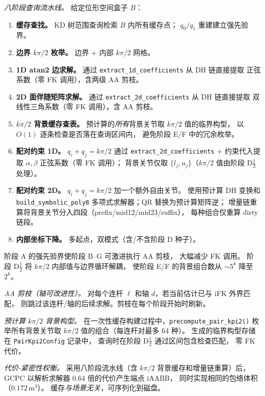 \documentclass[journal]{IEEEtran}
\begin{document}
\emph{八阶段查询流水线。}
给定位形空间盒子 $B$：
\begin{enumerate}
  \item[\textbf{A.}] \textbf{缓存查找。}
    KD 树范围查询检索 $B$ 内所有缓存点；
    $q_0/q_1$ 重建建立强先验界。
  \item[\textbf{B.}] \textbf{边界 $k\pi/2$ 枚举。}
    边界 + 内部 $k\pi/2$ 网格。
  \item[\textbf{C.}] \textbf{1D atan2 边求解。}
    通过 \texttt{extract\_1d\_coefficients} 从 DH 链直接提取
    正弦系数（零 FK 调用），含两级 AA 剪枝。
  \item[\textbf{D.}] \textbf{2D 面伴随矩阵求解。}
    通过 \texttt{extract\_2d\_coefficients} 从 DH 链直接提取
    双线性三角系数（零 FK 调用），含 AA 剪枝。
  \item[\textbf{D$\tfrac{1}{2}$.}] \textbf{$k\pi/2$ 背景缓存查表。}
    预计算的\emph{所有}背景关节取 $k\pi/2$ 值的临界构型，
    以 $O(1)$ 逐条检查是否落在查询区间内，
    避免阶段 E/F 中的冗余枚举。
  \item[\textbf{E.}] \textbf{配对约束 1D。}
    $q_i + q_j = k\pi/2$ 通过 \texttt{extract\_2d\_coefficients}
    + 约束代入提取 $\alpha,\beta$ 正弦系数（零 FK 调用）；
    背景关节仅取 $\{l_j, u_j\}$（$k\pi/2$ 值由阶段 D$\tfrac{1}{2}$ 处理）。
  \item[\textbf{F.}] \textbf{配对约束 2D。}
    $q_i + q_j = k\pi/2$ 加一个额外自由关节。
    使用预计算 DH 变换和 \texttt{build\_symbolic\_poly8}
    多项式求解器；QR 替换为预计算矩阵逆；
    增量链重算将背景关节分入四段（prefix/mid12/mid23/suffix），
    每种组合仅重算 dirty 链段。
  \item[\textbf{G.}] \textbf{内部坐标下降。}
    多起点，双模式（含/不含阶段 D 种子）。
\end{enumerate}
阶段 A 的强先验界使阶段 B--G 可激进执行 AA 剪枝，
大幅减少 FK 调用。
阶段 D$\tfrac{1}{2}$ 将 $k\pi/2$ 内部值与边界循环解耦，
使阶段 E/F 的背景组合数从 $\sim\!5^k$ 降至 $2^k$。

\emph{AA 剪枝（轴可改进性）。}
对每个连杆 $\ell$ 和轴 $d$，若当前估计已与 iFK 外界匹配，
则跳过该连杆/轴的后续求解。剪枝在每个阶段开始时刷新。

\emph{预计算 $k\pi/2$ 背景构型。}
在一次性缓存构建过程中，\texttt{precompute\_pair\_kpi2()}
枚举所有背景关节取 $k\pi/2$ 值的组合（每连杆对最多 64 种）。
生成的临界构型存储在 \texttt{PairKpi2Config} 记录中，
查询时在阶段 D$\tfrac{1}{2}$ 通过区间包含检查匹配，
零 FK 代价。

\emph{代价-紧密性权衡。}
采用八阶段流水线（含 $k\pi/2$ 背景缓存和增量链重算）后，
GCPC 以解析求解器 $0.64$ 倍的代价产生端点 iAABB，
同时实现相同的包络体积（$0.172$\,m$^3$）。
缓存\emph{与场景无关}，可序列化到磁盘。
\end{document}
